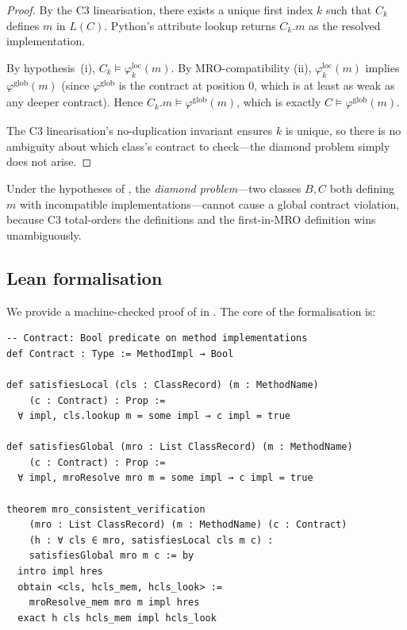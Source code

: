 \documentclass[11pt]{article}
\newcommand{\Clin}[1]{L(#1)}                     %
\newcommand{\LocalContr}[1]{\varphi_{#1}^{\mathrm{loc}}}
\newcommand{\GlobalContr}[1]{\varphi_{#1}^{\mathrm{glob}}}
\newcommand{\ContractSat}{\models}
\begin{document}
\begin{proof}
  By the C3 linearisation, there exists a unique first index $k$ such
  that $C_k$ defines $m$ in $\Clin{C}$.  Python's attribute lookup
  returns $C_k.m$ as the resolved implementation.

  By hypothesis~(i), $C_k \ContractSat \LocalContr{k}(m)$.
  By MRO-compatibility (ii), $\LocalContr{k}(m)$ implies
  $\GlobalContr{}(m)$ (since $\GlobalContr{}$ is the contract at
  position 0, which is at least as weak as any deeper contract).
  Hence $C_k.m \ContractSat \GlobalContr{}(m)$, which is exactly
  $C \ContractSat \GlobalContr{}(m)$.

  The C3 linearisation's no-duplication invariant ensures $k$ is
  unique, so there is no ambiguity about which class's contract to
  check---the diamond problem simply does not arise.
\end{proof}

\begin{corollary}\label{cor:no-diamond}
  Under the hypotheses of ,
  the \emph{diamond problem}---two classes $B, C$ both defining $m$
  with incompatible implementations---cannot cause a global contract
  violation, because C3 total-orders the definitions and the
  first-in-MRO definition wins unambiguously.
\end{corollary}

\subsection{Lean formalisation}

We provide a machine-checked proof of  in
\LEAN.  The core of the formalisation is:

\begin{lstlisting}[style=jugeo-python,
  caption={Lean 4 statement of \texttt{mro\_consistent\_verification}.
    \texttt{satisfiesLocal} requires that each body contributed by a
    class passes the contract; \texttt{satisfiesGlobal} requires that
    whatever MRO resolution returns also passes.},
  label=lst:lean-main]
-- Contract: Bool predicate on method implementations
def Contract : Type := MethodImpl → Bool

def satisfiesLocal (cls : ClassRecord) (m : MethodName)
    (c : Contract) : Prop :=
  ∀ impl, cls.lookup m = some impl → c impl = true

def satisfiesGlobal (mro : List ClassRecord) (m : MethodName)
    (c : Contract) : Prop :=
  ∀ impl, mroResolve mro m = some impl → c impl = true

theorem mro_consistent_verification
    (mro : List ClassRecord) (m : MethodName) (c : Contract)
    (h : ∀ cls ∈ mro, satisfiesLocal cls m c) :
    satisfiesGlobal mro m c := by
  intro impl hres
  obtain <cls, hcls_mem, hcls_look> :=
    mroResolve_mem mro m impl hres
  exact h cls hcls_mem impl hcls_look
\end{lstlisting}
\end{document}
